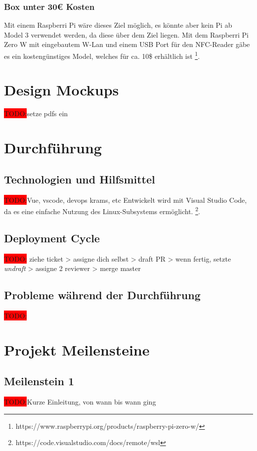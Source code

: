 \documentclass[10pt, a4paper, draft]{article}
\begin{document}
\subsubsection{Box unter 30€ Kosten}
Mit einem Raspberri Pi wäre dieses Ziel möglich, es könnte aber kein Pi ab Model 3 verwendet werden, da diese über dem Ziel liegen.
Mit dem Raspberri Pi Zero W mit eingebautem W-Lan und einem USB Port für den NFC-Reader gäbe es ein kostengünstiges Model, welches für ca. 10\$ erhältlich ist \footnote{https://www.raspberrypi.org/products/raspberry-pi-zero-w/}.

\section{Design Mockups}
\colorbox{red}{TODO:}setze pdfs ein

\section{Durchführung}

\subsection{Technologien und Hilfsmittel}
\colorbox{red}{TODO:}Vue, vscode, devops krams, etc
Entwickelt wird mit Visual Studio Code, da es eine einfache Nutzung des Linux-Subsystems ermöglicht. \footnote{https://code.visualstudio.com/docs/remote/wsl}.

\subsection{Deployment Cycle}
\colorbox{red}{TODO:} ziehe ticket > assigne dich selbst > draft PR > wenn fertig, setzte \textit{undraft} > assigne 2 reviewer > merge master

\subsection{Probleme während der Durchführung}
\colorbox{red}{TODO:}

\section{Projekt Meilensteine}
\subsection{Meilenstein 1}
\colorbox{red}{TODO:}Kurze Einleitung, von wann bis wann ging
\end{document}
